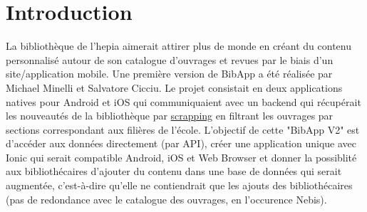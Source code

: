 \documentclass[a4paper, 12pt]{article}
\begin{document}
\newpage

\tableofcontents
\listoffigures
\renewcommand\listoflistingscaption{Table des listings de code source}
\listoflistings
\newpage

\section{Introduction}
La bibliothèque de l'hepia aimerait attirer plus de monde en créant du contenu personnalisé autour de son
catalogue d'ouvrages et revues par le biais d'un site/application mobile. Une première version de BibApp a été réalisée
par Michael Minelli et Salvatore Cicciu. Le projet consistait en deux applications natives pour Android et iOS qui
communiquaient avec un backend qui récupérait les nouveautés de la bibliothèque par
\href{https://fr.wikipedia.org/wiki/Web_scraping}{scrapping} en filtrant les ouvrages par sections correspondant aux
filières de l'école. L'objectif de cette "BibApp V2" est d'accéder aux données directement (par API), créer une
application unique avec Ionic qui serait compatible Android, iOS et Web Browser et donner la possiblité aux
bibliothécaires d'ajouter du contenu dans une base de données qui serait augmentée, c'est-à-dire qu'elle ne contiendrait 
que les ajouts des bibliothécaires (pas de redondance avec le catalogue des ouvrages, en l'occurence Nebis).
\end{document}

